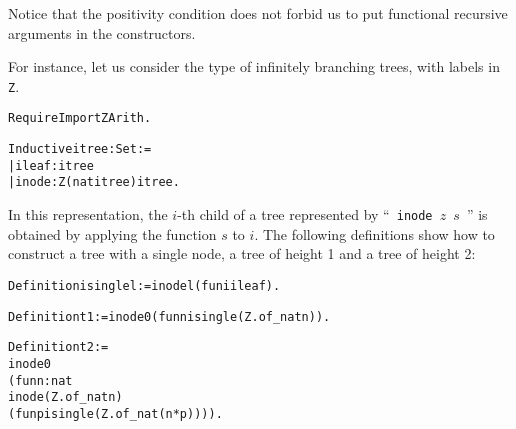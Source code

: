 \documentclass[11pt]{article}
\begin{document}




Notice that the positivity condition does not forbid us to
put  functional recursive
arguments in the constructors.

For instance, let us consider the type of infinitely branching trees,
with labels in \texttt{Z}.
\begin{alltt}
Require Import ZArith.

Inductive itree : Set :=
| ileaf : itree
| inode : Z {\arrow} (nat {\arrow} itree) {\arrow} itree.
\end{alltt}

In this representation, the $i$-th child of a tree
represented by ``~\texttt{inode $z$ $s$}~'' is obtained by applying
the function $s$ to $i$.
The following definitions show how to construct a tree with a single
node, a tree of height 1 and a tree of height 2:

\begin{alltt}
Definition isingle l := inode l (fun i {\funarrow} ileaf).

Definition t1 := inode 0 (fun n {\funarrow} isingle (Z.of_nat n)).

Definition t2 :=
 inode 0
      (fun n : nat {\funarrow}
                   inode (Z.of_nat n)
                   (fun p {\funarrow} isingle (Z.of_nat (n*p)))).
\end{alltt}
\end{document}
